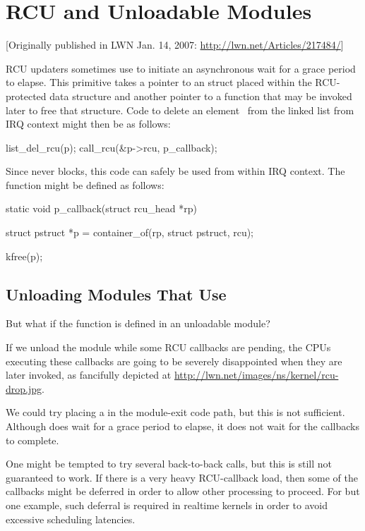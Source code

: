 \section{RCU and Unloadable Modules}
\label{sec:rcu:RCU and Unloadable Modules}

[Originally published in LWN Jan. 14, 2007: \url{http://lwn.net/Articles/217484/}]

RCU updaters sometimes use  to initiate an asynchronous wait for
a grace period to elapse.
This primitive takes a pointer to an 
struct placed within the RCU-protected data structure and another pointer
to a function that may be invoked later to free that structure.
Code to
delete an element~ from the linked list from IRQ context might then be
as follows:

\begin{VerbatimU}
	list_del_rcu(p);
	call_rcu(&p->rcu, p_callback);
\end{VerbatimU}

Since  never blocks, this code can safely be used from within
IRQ context.
The function  might be defined as follows:

\begin{VerbatimU}
	static void p_callback(struct rcu_head *rp)
	{
		struct pstruct *p = container_of(rp, struct pstruct, rcu);

		kfree(p);
	}
\end{VerbatimU}


\subsection{Unloading Modules That Use }
\label{sec:rcu:Unloading Modules That Use call_rcu()}

But what if the  function is defined in an unloadable module?

If we unload the module while some RCU callbacks are pending,
the CPUs executing these callbacks are going to be severely
disappointed when they are later invoked, as fancifully depicted at
\url{http://lwn.net/images/ns/kernel/rcu-drop.jpg}.

We could try placing a  in the module-exit code path,
but this is not sufficient.
Although  does wait for a
grace period to elapse, it does not wait for the callbacks to complete.

One might be tempted to try several back-to-back 
calls, but this is still not guaranteed to work.
If there is a very
heavy RCU-callback load, then some of the callbacks might be deferred in
order to allow other processing to proceed.
For but one example, such
deferral is required in realtime kernels in order to avoid excessive
scheduling latencies.



